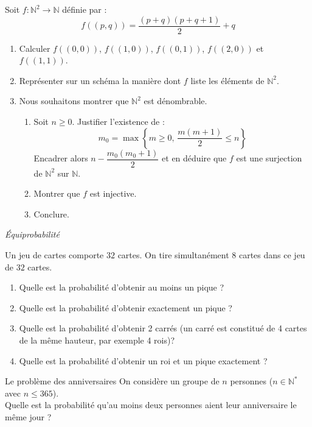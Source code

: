 \documentclass[a4paper,10pt]{report}
\begin{document}
\begin{Exercice}{}  Soit $f : \mathbb{N}^2 \rightarrow \mathbb{N}$ définie par :
$$ f((p,q)) = \frac{(p+q)(p+q+1)}{2} + q$$
\begin{enumerate}
\item Calculer $f((0,0))$, $f((1,0))$, $f((0,1))$, $f((2,0))$ et $f((1,1))$.
\item Représenter sur un schéma la manière dont $f$ liste les éléments de $\mathbb{N}^2$.
\item Nous souhaitons montrer que $\mathbb{N}^2$ est dénombrable. 
\begin{enumerate}
\item Soit $n \geq 0$. Justifier l'existence de :
$$ m_0 = \max \left\lbrace m \geq 0, \, \frac{m(m+1)}{2} \leq n \right\rbrace$$
Encadrer alors $n-\dfrac{m_0(m_0+1)}{2}$ et en déduire que $f$ est une surjection de $\mathbb{N}^2$ sur $\mathbb{N}$.
\item Montrer que $f$ est injective.
\item Conclure.
\end{enumerate}
\end{enumerate}
\end{Exercice}




\medskip

\begin{center}
\textit{{ {\large Équiprobabilité}}}
\end{center}

\medskip



\begin{Exercice}{} Un jeu de cartes comporte $32$ cartes. On tire simultanément $8$ cartes dans ce jeu de $32$ cartes. 

\begin{enumerate}
\item Quelle est la probabilité d'obtenir au moins un pique ?
\item Quelle est la probabilité d'obtenir exactement un pique ?
\item Quelle est la probabilité d'obtenir 2 carrés (un carré est constitué de 4 cartes de la même hauteur, par exemple 4 rois)?
\item Quelle est la probabilité d'obtenir un roi et un pique exactement ?
\end{enumerate}
\end{Exercice} 



\begin{Exercice}{Le problème des anniversaires}
On considère un groupe de $n$ personnes ($n \in \mathbb{N}^*$ avec $n \leq 365$).\\
Quelle est la probabilité qu'au moins deux personnes aient leur anniversaire le même jour ?
\end{Exercice}
\end{document}
